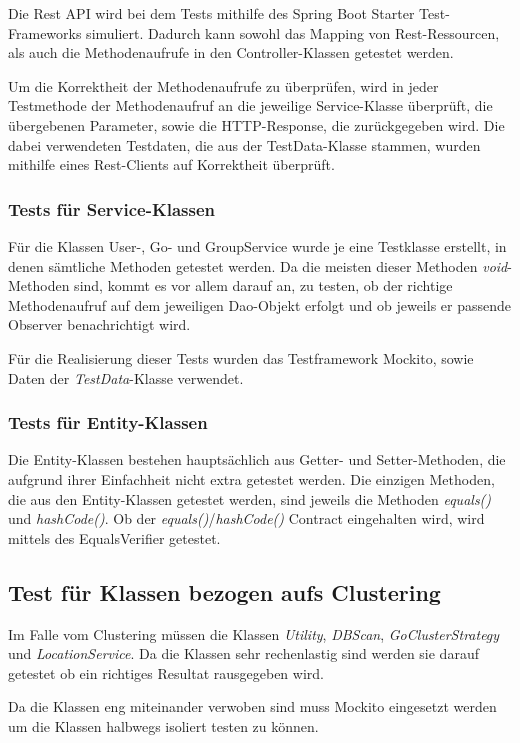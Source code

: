 \documentclass[11pt,a4paper]{scrartcl}
\begin{document}
Die Rest API wird bei dem Tests mithilfe des Spring Boot Starter Test-Frameworks simuliert. Dadurch kann sowohl das Mapping von Rest-Ressourcen, als auch die Methodenaufrufe in den Controller-Klassen getestet werden.

Um die Korrektheit der Methodenaufrufe zu überprüfen, wird in jeder Testmethode der Methodenaufruf an die jeweilige Service-Klasse überprüft, die übergebenen Parameter, sowie die HTTP-Response, die zurückgegeben wird. Die dabei verwendeten Testdaten, die aus der TestData-Klasse stammen, wurden mithilfe eines Rest-Clients auf Korrektheit überprüft.

\subsubsection{Tests für Service-Klassen}
Für die Klassen User-, Go- und GroupService wurde je eine Testklasse erstellt, in denen sämtliche Methoden getestet werden. Da die meisten dieser Methoden \textit{void}-Methoden sind, kommt es vor allem darauf an, zu testen, ob der richtige Methodenaufruf auf dem jeweiligen Dao-Objekt erfolgt und ob jeweils er passende Observer benachrichtigt wird.

Für die Realisierung dieser Tests wurden das Testframework Mockito, sowie Daten der \textit{TestData}-Klasse verwendet.

\subsubsection{Tests für Entity-Klassen}
Die Entity-Klassen bestehen hauptsächlich aus Getter- und Setter-Methoden, die aufgrund ihrer Einfachheit nicht extra getestet werden. Die einzigen Methoden, die aus den Entity-Klassen getestet werden, sind jeweils die Methoden \textit{equals()} und \textit{hashCode()}. Ob der \textit{equals()}/\textit{hashCode()} Contract eingehalten wird, wird mittels des EqualsVerifier getestet.

\subsection{Test für Klassen bezogen aufs Clustering}
Im Falle vom Clustering müssen die Klassen \textit{Utility}, \textit{DBScan}, \textit{GoClusterStrategy} und \textit{LocationService}. Da die Klassen sehr rechenlastig sind werden sie darauf getestet ob ein richtiges Resultat rausgegeben wird.

Da die Klassen eng miteinander verwoben sind muss Mockito eingesetzt werden um die Klassen halbwegs isoliert testen zu können.
\end{document}
